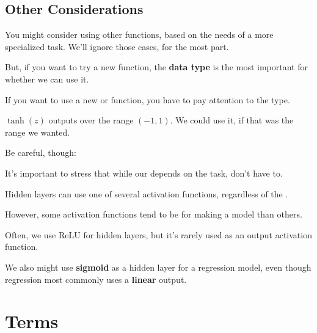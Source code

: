     \phantom{}{}

    \subsection{Other Considerations}
    
        You might consider using other functions, based on the needs of a more specialized task. We'll ignore those cases, for the most part.
        
        But, if you want to try a new function, the \textbf{data type} is the most important for whether we can use it.\\
    
        \begin{concept}
            If you want to use a new  or  function, you have to pay attention to the  type.
        \end{concept}
    
        \miniex $\tanh(z)$ outputs over the range $(-1, 1)$. We could use it, if that was the range we wanted.
    
        Be careful, though:\\
    
        \begin{clarification}
            It's important to stress that while our  depends on the task,  don't have to.
    
            Hidden layers can use one of several  activation functions, regardless of the .

            However, some activation functions tend to be  for making a model than others.
        \end{clarification}
    
        \miniex Often, we use ReLU for hidden layers, but it's rarely used as an output activation function. 
        
        We also might use \textbf{sigmoid} as a hidden layer for a regression model, even though regression most commonly uses a \textbf{linear} output.

    
    
\pagebreak

\section*{Terms}

